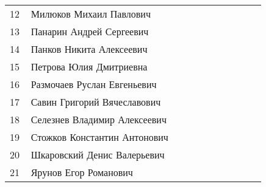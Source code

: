 \documentclass[a4paper,landscape,11pt]{article}
\begin{document}
\begin{tabular}{p{7pt}|l|p{\CS}|p{\CS}|p{\CS}|p{\CS}|p{\CS}|p{\CS}|p{\CS}|p{\CS}|p{\CS}}
12\,& Милюков Михаил Павлович         &&&&&&&&\\
13\,& Панарин Андрей Сергеевич        &&&&&&&&\\
14\,& Панков Никита Алексеевич        &&&&&&&&\\
15\,& Петрова Юлия Дмитриевна         &&&&&&&&\\
\midrule
16\,& Размочаев Руслан Евгеньевич     &&&&&&&&\\
17\,& Савин Григорий Вячеславович     &&&&&&&&\\
18\,& Селезнев Владимир Алексеевич    &&&&&&&&\\ 
19\,& Стожков Константин Антонович    &&&&&&&&\\
20\,& Шкаровский Денис Валерьевич     &&&&&&&&\\
\midrule
21\,& Ярунов Егор Романович           &&&&&&&&\\
\bottomrule
\end{tabular} 
\end{document}
